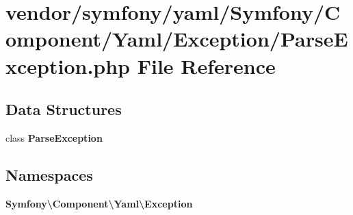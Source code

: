 \section{vendor/symfony/yaml/\+Symfony/\+Component/\+Yaml/\+Exception/\+Parse\+Exception.php File Reference}
\label{_parse_exception_8php}
\subsection*{Data Structures}
\begin{DoxyCompactItemize}
\item 
class {\bf Parse\+Exception}
\end{DoxyCompactItemize}
\subsection*{Namespaces}
\begin{DoxyCompactItemize}
\item 
 {\bf Symfony\textbackslash{}\+Component\textbackslash{}\+Yaml\textbackslash{}\+Exception}
\end{DoxyCompactItemize}

